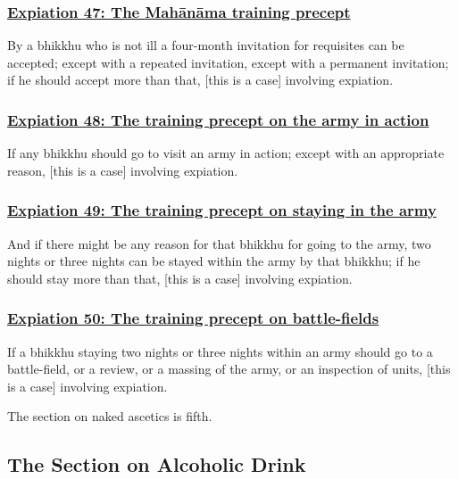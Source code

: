 \subsubsection*{\hyperref[pac47]{Expiation 47: The Mahānāma training precept}}
\label{exp47}
By a bhikkhu who is not ill a four-month invitation for requisites can be accepted; except with a repeated invitation, except with a permanent invitation; if he should accept more than that, [this is a case] involving expiation.



\subsubsection*{\hyperref[pac48]{Expiation 48: The training precept on the army in action}}
\label{exp48}
If any bhikkhu should go to visit an army in action; except with an appropriate reason, [this is a case] involving expiation.



\subsubsection*{\hyperref[pac49]{Expiation 49: The training precept on staying in the army}}
\label{exp49}
And if there might be any reason for that bhikkhu for going to the army, two nights or three nights can be stayed within the army by that bhikkhu; if he should stay more than that, [this is a case] involving expiation.



\subsubsection*{\hyperref[pac50]{Expiation 50: The training precept on battle-fields}}
\label{exp50}
If a bhikkhu staying two nights or three nights within an army should go to a battle-field, or a review, or a massing of the army, or an inspection of units, [this is a case] involving expiation.

\begin{center}
The section on naked ascetics is fifth.
\end{center}



\setsubsecheadstyle{\subsectionFmt}
\subsection{The Section on Alcoholic Drink}
\label{exp-vagga6}

